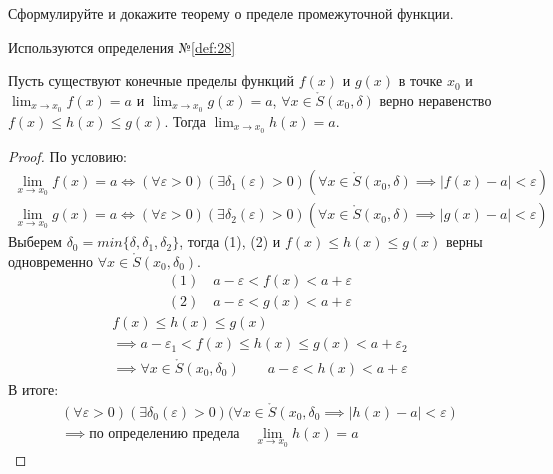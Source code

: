 \begin{question}
    Сформулируйте и докажите теорему о пределе промежуточной функции.
\end{question}
\begin{used}
    Используются определения №\ref{def:28}
\end{used}
\begin{theorem} 
    Пусть существуют конечные пределы функций $f(x)$ и $g(x)$ в точке  $x_0$ и $\lim_{x \to x_0} f(x) = a$ и $\lim_{x \to x_0} g(x) = a$, $\forall x \in \mathring{S}(x_0, \delta)$ верно неравенство $f(x) \le h(x) \le g(x)$. Тогда $\lim_{x \to x_0} h(x) = a$.
\end{theorem}
\begin{proof}
    По условию: 
    \begin{gather*}
        \lim_{x \to x_0} f(x) = a \iff (\forall \varepsilon > 0)(\exists \delta_1(\varepsilon) > 0)(\forall x \in \mathring{S}(x_0, \delta) \implies |f(x) - a| < \varepsilon) \tag{1} \\
        \lim_{x \to x_0} g(x) = a \iff (\forall \varepsilon > 0)(\exists \delta_2(\varepsilon) > 0)(\forall x \in \mathring{S}(x_0, \delta) \implies |g(x) - a| < \varepsilon) \tag{2}
    \end{gather*}
    Выберем $\delta_0 = min \{\delta, \delta_1, \delta_2\}$, тогда (1), (2) и $f(x) \le h(x) \le g(x)$ верны одновременно $\forall x \in \mathring{S}(x_0, \delta_0)$.
    \begin{align*}
        (1) \quad a - \varepsilon < f(x) < a + \varepsilon \\
        (2) \quad a - \varepsilon < g(x) < a + \varepsilon
    \end{align*}
    \begin{gather*}
        f(x) \le h(x) \le g(x) \\
        \implies a - \varepsilon_1 < f(x) \le h(x) \le g(x) < a + \varepsilon_2 \\
        \implies \forall x \in \mathring{S}(x_0, \delta_0) \qquad a - \varepsilon < h(x) < a + \varepsilon
    \end{gather*}
    В итоге:
    \begin{gather*}
        (\forall \varepsilon > 0)(\exists \delta_0(\varepsilon) > 0)(\forall x \in \mathring{S}(x_0, \delta_0 \implies |h(x) - a| < \varepsilon) \\
        \implies \text{по определению предела} \quad \lim_{x \to x_0} h(x) = a
    \end{gather*}
\end{proof}



